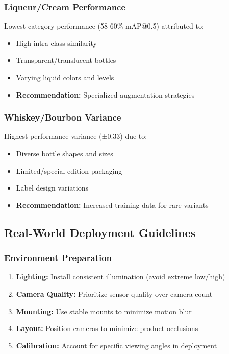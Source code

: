\documentclass[conference]{IEEEtran}
\begin{document}
\subsubsection{Liqueur/Cream Performance}
Lowest category performance (58-60\% mAP@0.5) attributed to:
\begin{itemize}
    \item High intra-class similarity
    \item Transparent/translucent bottles
    \item Varying liquid colors and levels
    \item \textbf{Recommendation:} Specialized augmentation strategies
\end{itemize}

\subsubsection{Whiskey/Bourbon Variance}
Highest performance variance (±0.33) due to:
\begin{itemize}
    \item Diverse bottle shapes and sizes
    \item Limited/special edition packaging
    \item Label design variations
    \item \textbf{Recommendation:} Increased training data for rare variants
\end{itemize}

\subsection{Real-World Deployment Guidelines}

\subsubsection{Environment Preparation}
\begin{enumerate}
    \item \textbf{Lighting:} Install consistent illumination (avoid extreme low/high)
    \item \textbf{Camera Quality:} Prioritize sensor quality over camera count
    \item \textbf{Mounting:} Use stable mounts to minimize motion blur
    \item \textbf{Layout:} Position cameras to minimize product occlusions
    \item \textbf{Calibration:} Account for specific viewing angles in deployment
\end{enumerate}
\end{document}
